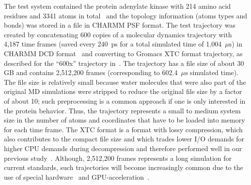The test system contained the protein adenylate kinase with 214 amino acid residues and 3341 atoms in total~\cite{Seyler:2014il} and the topology information (atoms types and bonds) was stored in a file in CHARMM PSF format.
The test trajectory was created by concatenating 600 copies of a molecular dynamics trajectory with 4,187 time frames (saved every 240~ps for a total simulated time of 1.004~$\mu\text{s}$) in CHARMM DCD format~\cite{Seyler:2017aa} and converting to Gromacs XTC format trajectory, as described for the ``600x'' trajectory in~\citet{Khoshlessan:2017ab}.
The trajectory has a file size of about 30 GB and contains 2,512,200 frames (corresponding to 602.4~$\mu\text{s}$ simulated time).
The file size is relatively small because water molecules that were also part of the original MD simulations were stripped to reduce the original file size by a factor of about 10; such preprocessing is a common approach if one is only interested in the protein behavior.
Thus, the trajectory represents a small to medium system size in the number of atoms and coordinates that have to be loaded into memory for each time frame.
The XTC format is a format with lossy compression, which also contributes to the compact file size and which trades lower I/O demands for higher CPU demands during decompression and therefore performed well in our previous study~\citep{Khoshlessan:2017ab}.
Although, 2,512,200 frames represents a long simulation for current standards, such trajectories will become increasingly common due to the use of special hardware~\citep{Shaw:2009ly} and GPU-acceleration~\citep{Salomon-Ferrer:2013cr, Glaser:2015ys}.
